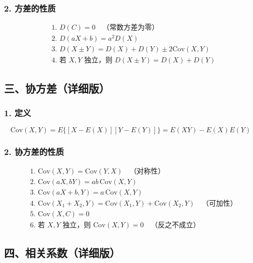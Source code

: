 \documentclass[12pt,a4paper]{ctexart}
\begin{document}
\subsubsection{2. 方差的性质}
\begin{align*}
     & \text{1. } D(C) = 0 \quad\text{（常数方差为零）}                  \\
     & \text{2. } D(aX + b) = a^2 D(X)                           \\
     & \text{3. } D(X \pm Y) = D(X) + D(Y) \pm 2\text{Cov}(X, Y) \\
     & \text{4. 若 } X, Y \text{ 独立，则 } D(X \pm Y) = D(X) + D(Y)
\end{align*}

\subsection{三、协方差（详细版）}

\subsubsection{1. 定义}
\[
    \text{Cov}(X, Y) = E\{[X - E(X)][Y - E(Y)]\} = E(XY) - E(X)E(Y)
\]

\subsubsection{2. 协方差的性质}
\begin{align*}
     & \text{1. } \text{Cov}(X, Y) = \text{Cov}(Y, X) \quad\text{（对称性）}                                \\
     & \text{2. } \text{Cov}(aX, bY) = ab\,\text{Cov}(X, Y)                                            \\
     & \text{3. } \text{Cov}(aX + b, Y) = a\,\text{Cov}(X, Y)                                          \\
     & \text{4. } \text{Cov}(X_1 + X_2, Y) = \text{Cov}(X_1, Y) + \text{Cov}(X_2, Y) \quad\text{（可加性）} \\
     & \text{5. } \text{Cov}(X, C) = 0                                                                 \\
     & \text{6. 若 } X, Y \text{ 独立，则 } \text{Cov}(X, Y) = 0 \quad\text{（反之不成立）}
\end{align*}

\subsection{四、相关系数（详细版）}
\end{document}
